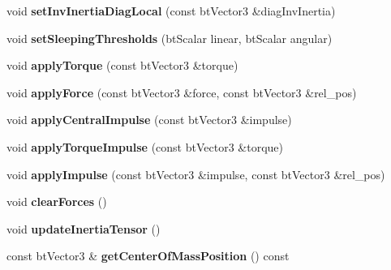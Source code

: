 \begin{DoxyCompactItemize}
\item 
\mbox{\label{classbtRigidBody_ac47e4f27b351e24ed180bb0fcfa5a51d}} 
void {\bfseries set\+Inv\+Inertia\+Diag\+Local} (const bt\+Vector3 \&diag\+Inv\+Inertia)
\item 
\mbox{\label{classbtRigidBody_a8ed442345551ea2d4e4b30ec19597b69}} 
void {\bfseries set\+Sleeping\+Thresholds} (bt\+Scalar linear, bt\+Scalar angular)
\item 
\mbox{\label{classbtRigidBody_aede3cf53474f4b367693b19871692b99}} 
void {\bfseries apply\+Torque} (const bt\+Vector3 \&torque)
\item 
\mbox{\label{classbtRigidBody_af016720c45cf7ccaf8701d81a28319d9}} 
void {\bfseries apply\+Force} (const bt\+Vector3 \&force, const bt\+Vector3 \&rel\+\_\+pos)
\item 
\mbox{\label{classbtRigidBody_a82f6590ea4fa13c359ae8809a5112ee7}} 
void {\bfseries apply\+Central\+Impulse} (const bt\+Vector3 \&impulse)
\item 
\mbox{\label{classbtRigidBody_a0084ebc850f06cd043d70ee87e6a3457}} 
void {\bfseries apply\+Torque\+Impulse} (const bt\+Vector3 \&torque)
\item 
\mbox{\label{classbtRigidBody_a8274f89d9e6b8fe945282797bd25f377}} 
void {\bfseries apply\+Impulse} (const bt\+Vector3 \&impulse, const bt\+Vector3 \&rel\+\_\+pos)
\item 
\mbox{\label{classbtRigidBody_a1ffe77aaa4d3712457aa8f9aa83f42a7}} 
void {\bfseries clear\+Forces} ()
\item 
\mbox{\label{classbtRigidBody_aeb2880f17187c3f28b4a253423aa71d1}} 
void {\bfseries update\+Inertia\+Tensor} ()
\item 
\mbox{\label{classbtRigidBody_aadd4ef35ebe3633314d04f09f91699ed}} 
const bt\+Vector3 \& {\bfseries get\+Center\+Of\+Mass\+Position} () const
\item 
\mbox{\label{classbtRigidBody_a6d50e07777d473368d189cba7850a798}} 

\end{DoxyCompactItemize}
